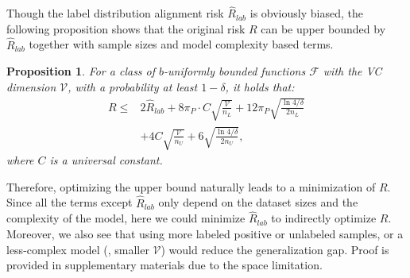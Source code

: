 \documentclass[final]{cvpr}
\newtheorem{prop}{Proposition}
\newcommand{\examplex}{\bm{x}}
\newcommand{\psubset}{\bm{X_{P}}}
\newcommand{\lsubset}{\bm{X_{L}}}
\newcommand{\usubset}{\bm{X_{U}}}
\newcommand{\hatrlim}[1]{\mathop{\inf}_{\eta \geq 0} \left\{ 8 \eta + \frac{32}{\sqrt{#1}} \int_{\eta}^{2} \sqrt{\log \left[ C\mathcal{V}(16e)^{\mathcal{V}} \left( \frac{1}{t} \right)^{2\mathcal{V}}  \right] } dt \right\} }
\newcommand{\hatrademacher}[1]{\hat{\mathfrak{R}}_{#1}(\mathcal{G})}
\newcommand{\epsdeltntwo}[1]{ \sqrt{ \frac{ \ln{ 4/ \delta} }{2 #1}} }
\newcommand{\bangyan}[1]{#1}
\begin{document}
\bangyan{Though the label distribution alignment risk $\hat{R}_{lab}$ is obviously biased, the following proposition shows that the original risk $R$} can be upper bounded by $\hat{R}_{lab}$ together with sample sizes and model complexity based terms.
\begin{prop}
For a class of $b$-uniformly bounded functions $\mathcal{F}$ with the VC dimension $\mathcal{V}$, with a probability at least $1-\delta$, it holds that:
\begin{align}
    R \leq & 2 \hat{R}_{lab} + 8\pi_{P} \cdot C \sqrt{\frac{\mathcal{V}}{n_{L}}} + 12\pi_{P} \epsdeltntwo{n_{L}} \nonumber \\
    & + 4 C \sqrt{\frac{\mathcal{V}}{n_{U}}} + 6 \epsdeltntwo{n_{U}},
\end{align}
where $C$ is a universal constant. 
\end{prop}
Therefore, optimizing the upper bound naturally leads to a minimization of $R$. Since all the terms except $\hat{R}_{lab}$ only depend on the dataset sizes and the complexity of the model, here we could minimize $\hat{R}_{lab}$ to indirectly optimize $R$. Moreover, we also see that using more labeled positive or unlabeled samples, or a less-complex model (\ie, smaller $\mathcal{V}$) would reduce the generalization gap. Proof is provided in supplementary materials due to the space limitation.
\end{document}
